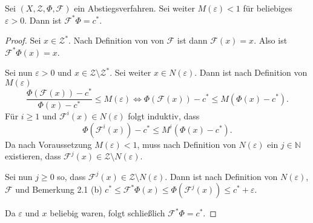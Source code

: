 \begin{satz}
	Sei $(X ,\mathcal{Z}, \Phi , \mathcal{F})$ ein Abstiegsverfahren. Sei weiter $M(\varepsilon) < 1$ für beliebiges $\varepsilon > 0$. Dann ist $\mathcal{F}^* \Phi = c^*$.
\end{satz}
\begin{proof}
	Sei $x \in \mathcal{Z}^*$. Nach Definition von  von $\mathcal{F}$ ist dann $\mathcal{F}(x) = x$. Also ist $\mathcal{F}^* \Phi(x) = x$. 
	
	Sei nun $\varepsilon > 0$ und $x \in \mathcal{Z} \setminus \mathcal{Z}^*$. Sei weiter $x \in N(\varepsilon)$.
	Dann ist nach Definition von $M(\varepsilon)$
	$$
	\frac{\Phi(\mathcal{F}(x)) - c^*}{\Phi(x) - c^*} \leq M(\varepsilon) \Leftrightarrow
	\Phi(\mathcal{F}(x)) - c^* \leq M(\Phi(x) - c^*).
	$$
	Für $i \geq 1$ und $\mathcal{F}^i(x) \in N(\varepsilon)$ folgt induktiv, dass
	$$
	\Phi(\mathcal{F}^i(x)) - c^* \leq M^i (\Phi(x) - c^*).
	$$
	Da nach Voraussetzung $M(\varepsilon) < 1$, muss nach Definition von $N(\varepsilon)$ ein $j \in \mathbb{N}$ existieren, dass $\mathcal{F}^j(x) \in \mathcal{Z} \setminus N(\varepsilon)$.
	
	Sei nun $j \geq 0$ so, dass $\mathcal{F}^j(x) \in \mathcal{Z} \setminus N(\varepsilon)$. Dann ist nach Definition von $N(\varepsilon)$, $\mathcal{F}$ und Bemerkung 2.1 (b)  $c^* \leq \mathcal{F}^* \Phi(x) \leq \Phi(\mathcal{F}^j(x)) \le c^* + \varepsilon$. 
	
	Da $\varepsilon$ und $x$ beliebig waren, folgt schließlich $\mathcal{F}^*\Phi = c^*$.
\end{proof}

